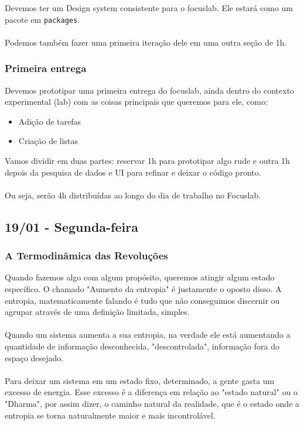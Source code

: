 \documentclass[11pt]{article}
\begin{document}
Devemos ter um Design system consistente para o focuslab. Ele estará como um pacote em {\tt packages}.\\\\
Podemos também fazer uma primeira iteração dele em uma outra seção de 1h.

\subsubsection{Primeira entrega}

Devemos prototipar uma primeira entrega do focuslab, ainda dentro do contexto experimental (lab) com as coisas principais que queremos para ele, como:

\begin{itemize}
    \item Adição de tarefas
    \item Criação de listas
\end{itemize}

Vamos dividir em duas partes: reservar 1h para prototipar algo rude e outra 1h depois da pesquisa de dados e UI para refinar e deixar o código pronto.\\\\

Ou seja, serão 4h distribuídas ao longo do dia de trabalho no Focuslab.

\subsection{19/01 - Segunda-feira}
\subsubsection{A Termodinâmica das Revoluções}

Quando fazemos algo com algum propósito, queremos atingir algum estado específico. O chamado "Aumento da entropia" é justamente o oposto disso. A entropia, matematicamente falando é tudo que não conseguimos discernir ou agrupar através de uma definição limitada, simples.\\\\

Quando um sistema aumenta a sua entropia, na verdade ele está aumentando a quantidade de informação desconhecida, "descontrolada", informação fora do espaço desejado.\\\\

Para deixar um sistema em um estado fixo, determinado, a gente gasta um excesso de energia. Esse excesso é a diferença em relação ao "estado natural" ou o "Dharma", por assim dizer, o caminho natural da realidade, que é o estado onde a entropia se torna naturalmente maior e mais incontrolável.\\\\
\end{document}
